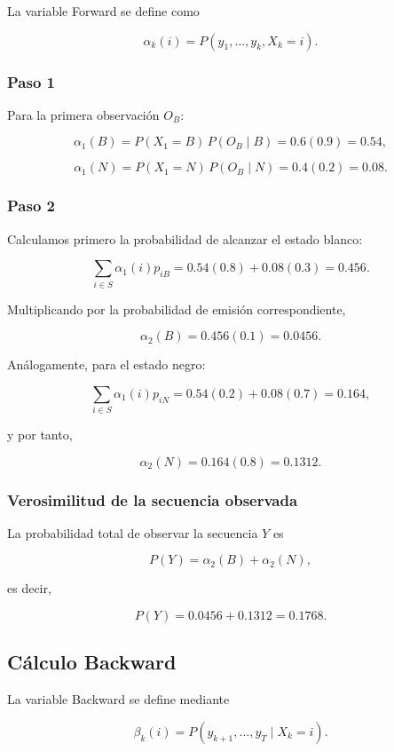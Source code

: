\documentclass[
  spanish,
  us-letterpaper,
  DIV=11,
  numbers=noendperiod]{scrreprt}
\begin{document}
La variable Forward se define como

\[
\alpha_k(i)
=
P(y_1,\ldots,y_k,X_k=i).
\]

\subsubsection{Paso 1}\label{paso-1}

Para la primera observación \(O_B\):

\[
\alpha_1(B)
=
P(X_1=B)\,P(O_B\mid B)
=
0.6(0.9)
=
0.54,
\]

\[
\alpha_1(N)
=
P(X_1=N)\,P(O_B\mid N)
=
0.4(0.2)
=
0.08.
\]

\subsubsection{Paso 2}\label{paso-2}

Calculamos primero la probabilidad de alcanzar el estado blanco:

\[
\sum_{i\in S}
\alpha_1(i)p_{iB}
=
0.54(0.8)+0.08(0.3)
=
0.456.
\]

Multiplicando por la probabilidad de emisión correspondiente,

\[
\alpha_2(B)
=
0.456(0.1)
=
0.0456.
\]

Análogamente, para el estado negro:

\[
\sum_{i\in S}
\alpha_1(i)p_{iN}
=
0.54(0.2)+0.08(0.7)
=
0.164,
\]

y por tanto,

\[
\alpha_2(N)
=
0.164(0.8)
=
0.1312.
\]

\subsubsection{Verosimilitud de la secuencia
observada}\label{verosimilitud-de-la-secuencia-observada}

La probabilidad total de observar la secuencia \(Y\) es

\[
P(Y)
=
\alpha_2(B)+\alpha_2(N),
\]

es decir,

\[
P(Y)
=
0.0456+0.1312
=
0.1768.
\]

\subsection{Cálculo Backward}\label{cuxe1lculo-backward}

La variable Backward se define mediante

\[
\beta_k(i)
=
P(y_{k+1},\ldots,y_T\mid X_k=i).
\]
\end{document}

